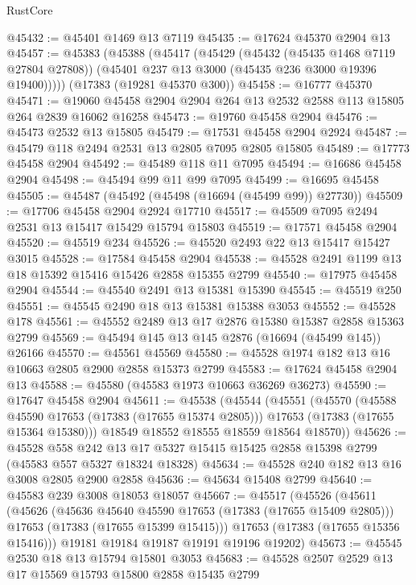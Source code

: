 \begin{lexlean}{RustCore}
\begin{coremodule}
@45432 := @45401 @1469 @13 @7119
@45435 := @17624 @45370 @2904 @13
@45457 := @45383
    (@45388
      (@45417
        (@45429
          (@45432 (@45435 @1468 @7119 @27804 @27808))
          (@45401 @237 @13 @3000 (@45435 @236 @3000 @19396 @19400)))))
    (@17383 (@19281 @45370 @300))
@45458 := @16777 @45370
@45471 := @19060 @45458 @2904 @2904 @264 @13 @2532 @2588 @113 @15805 @264 @2839 @16062 @16258
@45473 := @19760 @45458 @2904
@45476 := @45473 @2532 @13 @15805
@45479 := @17531 @45458 @2904 @2924
@45487 := @45479 @118 @2494 @2531 @13 @2805 @7095 @2805 @15805
@45489 := @17773 @45458 @2904
@45492 := @45489 @118 @11 @7095
@45494 := @16686 @45458 @2904
@45498 := @45494 @99 @11 @99 @7095
@45499 := @16695 @45458
@45505 := @45487 (@45492 (@45498 (@16694 (@45499 @99)) @27730))
@45509 := @17706 @45458 @2904 @2924 @17710
@45517 := @45509 @7095 @2494 @2531 @13 @15417 @15429 @15794 @15803
@45519 := @17571 @45458 @2904
@45520 := @45519 @234
@45526 := @45520 @2493 @22 @13 @15417 @15427 @3015
@45528 := @17584 @45458 @2904
@45538 := @45528 @2491 @1199 @13 @18 @15392 @15416 @15426 @2858 @15355 @2799
@45540 := @17975 @45458 @2904
@45544 := @45540 @2491 @13 @15381 @15390
@45545 := @45519 @250
@45551 := @45545 @2490 @18 @13 @15381 @15388 @3053
@45552 := @45528 @178
@45561 := @45552 @2489 @13 @17 @2876 @15380 @15387 @2858 @15363 @2799
@45569 := @45494 @145 @13 @145 @2876 (@16694 (@45499 @145)) @26166
@45570 := @45561 @45569
@45580 := @45528 @1974 @182 @13 @16 @10663 @2805 @2900 @2858 @15373 @2799
@45583 := @17624 @45458 @2904 @13
@45588 := @45580 (@45583 @1973 @10663 @36269 @36273)
@45590 := @17647 @45458 @2904
@45611 := @45538
    (@45544
      (@45551
        (@45570
          (@45588 @45590 @17653 (@17383 (@17655 @15374 @2805)))
          @17653
          (@17383 (@17655 @15364 @15380)))
        @18549
        @18552
        @18555
        @18559
        @18564
        @18570))
@45626 := @45528
    @558
    @242
    @13
    @17
    @5327
    @15415
    @15425
    @2858
    @15398
    @2799
    (@45583 @557 @5327 @18324 @18328)
@45634 := @45528 @240 @182 @13 @16 @3008 @2805 @2900 @2858
@45636 := @45634 @15408 @2799
@45640 := @45583 @239 @3008 @18053 @18057
@45667 := @45517
    (@45526
      (@45611
        (@45626
          (@45636 @45640 @45590 @17653 (@17383 (@17655 @15409 @2805)))
          @17653
          (@17383 (@17655 @15399 @15415)))
        @17653
        (@17383 (@17655 @15356 @15416)))
      @19181
      @19184
      @19187
      @19191
      @19196
      @19202)
@45673 := @45545 @2530 @18 @13 @15794 @15801 @3053
@45683 := @45528 @2507 @2529 @13 @17 @15569 @15793 @15800 @2858 @15435 @2799

\end{coremodule}
\end{lexlean}
